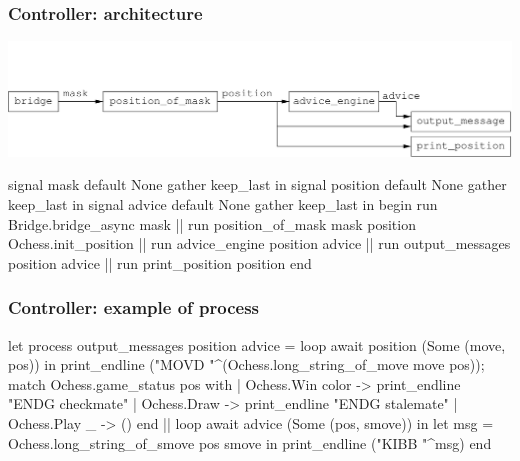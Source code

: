 \documentclass[t]{beamer}
\begin{document}

\begin{frame}[fragile]
\frametitle{Controller: architecture}

\includegraphics[scale=0.6]{figures/controller}

\pause

\begin{lstrml}
  signal mask default None gather keep_last in
  signal position default None gather keep_last in
  signal advice default None gather keep_last in
  begin
    run Bridge.bridge_async mask ||
    run position_of_mask mask position Ochess.init_position ||
    run advice_engine position advice ||
    run output_messages position advice ||
    run print_position position
  end
\end{lstrml}

\end{frame}


\begin{frame}[fragile]
\frametitle{Controller: example of process}

\begin{lstrml}
let process output_messages position advice =
  loop
    await position (Some (move, pos)) in
    print_endline ("MOVD "^(Ochess.long_string_of_move move pos));
    match Ochess.game_status pos with
    | Ochess.Win color -> print_endline "ENDG checkmate"
    | Ochess.Draw -> print_endline "ENDG stalemate"
    | Ochess.Play _ -> ()
  end
  ||
  loop
    await advice (Some (pos, smove)) in
    let msg = Ochess.long_string_of_smove pos smove in
    print_endline ("KIBB "^msg)
  end
\end{lstrml}

\end{frame}

\end{document}
